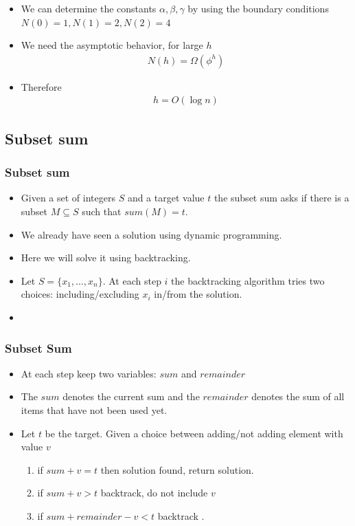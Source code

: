 \documentclass{beamer}
\newcommand{\set}[1]{\{#1\}}
\begin{document}
\begin{frame}
  \begin{itemize}
  \item We can determine the constants $\alpha,\beta,\gamma$ by using the boundary conditions $ N(0)=1, N(1)=2 ,N(2)=4$

\item We need the asymptotic behavior, for large $h$
  \begin{align*}
    N(h)=\Omega( \phi^h)
  \end{align*}
\item Therefore 
  \begin{align*}
    h=O(\log n)
  \end{align*}
  \end{itemize}
\end{frame}


\subsection{Subset sum}
\begin{frame}
  \frametitle{Subset sum}
\begin{itemize}
  \item Given a set of integers $S$ and a target value $t$ the subset sum asks if there is a subset $M\subseteq S$ such that $sum(M)=t$.
  \item We already have seen a solution using dynamic programming.
  \item Here we will solve it using backtracking.
  \item Let $S=\set{x_1,\ldots,x_n}$. At each step $i$ the backtracking algorithm tries two choices: including/excluding $x_i$ in/from the solution.
  \item 
\end{itemize}
  

\end{frame}
\begin{frame}
  \frametitle{Subset Sum}
\begin{itemize}
  \item At each step keep two variables: $sum$ and $remainder$
  \item The $sum$ denotes the current sum and the $remainder$ denotes the sum of all items that have not been used yet.
  \item Let $t$ be the target. Given a choice between adding/not adding element with value $v$
  \begin{enumerate}
    \item if $sum+v=t$ then solution found, return solution.
    \item if $sum+v>t$ backtrack, do not include $v$
    \item if $sum+remainder-v<t$ backtrack .
  \end{enumerate}
\end{itemize}
  

\end{frame}
\end{document}
